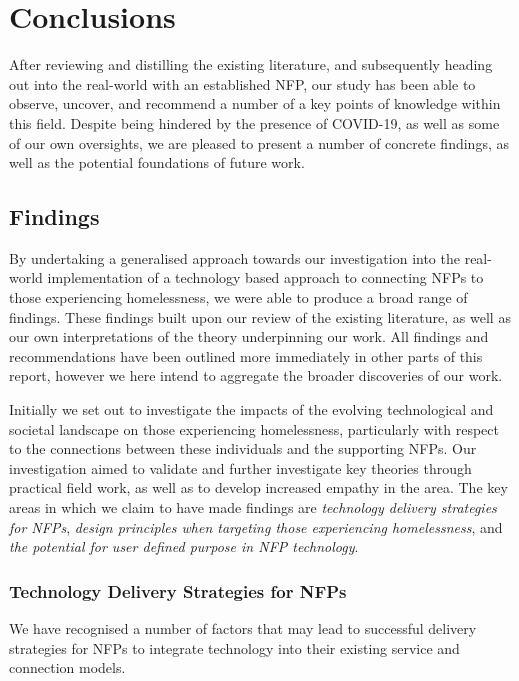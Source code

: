 \chapter{Conclusions}

After reviewing and distilling the existing literature, and subsequently heading out into the real-world with an established NFP, our study has been able to observe, uncover, and recommend a number of a key points of knowledge within this field. Despite being hindered by the presence of COVID-19, as well as some of our own oversights, we are pleased to present a number of concrete findings, as well as the potential foundations of future work.

\section{Findings}

By undertaking a generalised approach towards our investigation into the real-world implementation of a technology based approach to connecting NFPs to those experiencing homelessness, we were able to produce a broad range of findings. These findings built upon our review of the existing literature, as well as our own interpretations of the theory underpinning our work. All findings and recommendations have been outlined more immediately in other parts of this report, however we here intend to aggregate the broader discoveries of our work.

Initially we set out to investigate the impacts of the evolving technological and societal landscape on those experiencing homelessness, particularly with respect to the connections between these individuals and the supporting NFPs. Our investigation aimed to validate and further investigate key theories through practical field work, as well as to develop increased empathy in the area. The key areas in which we claim to have made findings are \emph{technology delivery strategies for NFPs}, \emph{design principles when targeting those experiencing homelessness}, and \emph{the potential for user defined purpose in NFP technology}.

\subsection{Technology Delivery Strategies for NFPs}

We have recognised a number of factors that may lead to successful delivery strategies for NFPs to integrate technology into their existing service and connection models. 

